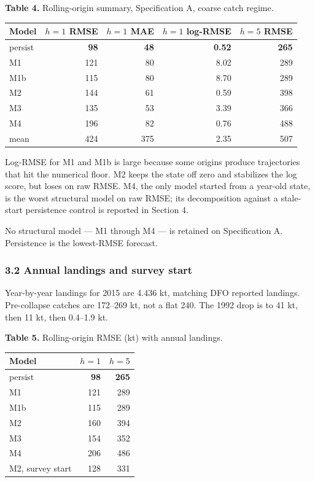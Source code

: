 \documentclass[11pt]{article}
\begin{document}
\textbf{Table 4.} Rolling-origin summary, Specification A, coarse catch
regime.

\begin{longtable}[]{@{}lrrrr@{}}
\toprule\noalign{}
Model & \(h=1\) RMSE & \(h=1\) MAE & \(h=1\) log-RMSE & \(h=5\) RMSE \\
\midrule\noalign{}
\endhead
\bottomrule\noalign{}
\endlastfoot
persist & \textbf{98} & \textbf{48} & \textbf{0.52} & \textbf{265} \\
M1 & 121 & 80 & 8.02 & 289 \\
M1b & 115 & 80 & 8.70 & 289 \\
M2 & 144 & 61 & 0.59 & 398 \\
M3 & 135 & 53 & 3.39 & 366 \\
M4 & 196 & 82 & 0.76 & 488 \\
mean & 424 & 375 & 2.35 & 507 \\
\end{longtable}

Log-RMSE for M1 and M1b is large because some origins produce
trajectories that hit the numerical floor. M2 keeps the state off zero
and stabilizes the log score, but loses on raw RMSE. M4, the only model started from a year-old state, is the worst
structural model on raw RMSE; its decomposition against a stale-start
persistence control is reported in Section 4.

No structural model --- M1 through M4 --- is retained on Specification
A. Persistence is the lowest-RMSE forecast.

\subsubsection{3.2 Annual landings and survey
start}\label{annual-landings-and-survey-start}

Year-by-year landings for 2015 are 4.436 kt, matching DFO reported
landings. Pre-collapse catches are 172--269 kt, not a flat 240. The 1992
drop is to 41 kt, then 11 kt, then 0.4--1.9 kt.

\textbf{Table 5.} Rolling-origin RMSE (kt) with annual landings.

\begin{longtable}[]{@{}lrr@{}}
\toprule\noalign{}
Model & \(h=1\) & \(h=5\) \\
\midrule\noalign{}
\endhead
\bottomrule\noalign{}
\endlastfoot
persist & \textbf{98} & \textbf{265} \\
M1 & 121 & 289 \\
M1b & 115 & 289 \\
M2 & 160 & 394 \\
M3 & 154 & 352 \\
M4 & 206 & 486 \\
M2, survey start & 128 & 331 \\
\end{longtable}
\end{document}
